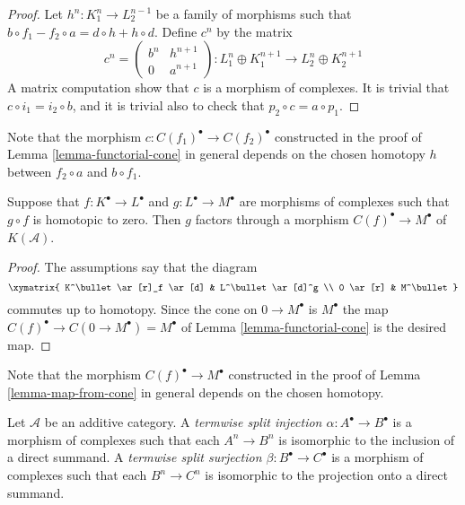 \begin{proof}
Let $h^n : K_1^n \to L_2^{n - 1}$ be a family of morphisms such that
$b \circ f_1 - f_2 \circ a= d \circ h + h \circ d$.
Define $c^n$ by the matrix
$$
c^n =
\left(
\begin{matrix}
b^n & h^{n + 1} \\
0 & a^{n + 1}
\end{matrix}
\right) :
L_1^n \oplus K_1^{n + 1} \to L_2^n \oplus K_2^{n + 1}
$$
A matrix computation show that $c$ is a morphism of complexes.
It is trivial that $c \circ i_1 = i_2 \circ b$, and it is
trivial also to check that $p_2 \circ c = a \circ p_1$.
\end{proof}

\noindent
Note that the morphism $c : C(f_1)^\bullet \to C(f_2)^\bullet$
constructed in the
proof of Lemma \ref{lemma-functorial-cone} in general depends on the
chosen homotopy $h$ between $f_2 \circ a$ and $b \circ f_1$.

\begin{lemma}
\label{lemma-map-from-cone}
Suppose that $f: K^\bullet \to L^\bullet$ and $g : L^\bullet \to M^\bullet$
are morphisms of complexes such that $g \circ f$ is homotopic to zero.
Then $g$ factors through a morphism
$C(f)^\bullet \to M^\bullet$ of $K(\mathcal{A})$.
\end{lemma}

\begin{proof}
The assumptions say that the diagram
$$
\xymatrix{
K^\bullet \ar[r]_f \ar[d] & L^\bullet \ar[d]^g \\
0 \ar[r] & M^\bullet
}
$$
commutes up to homotopy.
Since the cone on $0 \to M^\bullet$ is $M^\bullet$ the
map $C(f)^\bullet \to C(0 \to M^\bullet) = M^\bullet$
of Lemma \ref{lemma-functorial-cone}
is the desired map.
\end{proof}

\noindent
Note that the morphism $C(f)^\bullet \to M^\bullet$ constructed in the proof
of Lemma \ref{lemma-map-from-cone} in general depends on the
chosen homotopy.

\begin{definition}
\label{definition-termwise-split-map}
Let $\mathcal{A}$ be an additive category.
A {\it termwise split injection $\alpha : A^\bullet \to B^\bullet$}
is a morphism of complexes such that each $A^n \to B^n$
is isomorphic to the inclusion of a direct summand.
A {\it termwise split surjection $\beta : B^\bullet \to C^\bullet$}
is a morphism of complexes such that each $B^n \to C^n$
is isomorphic to the projection onto a direct summand.
\end{definition}

